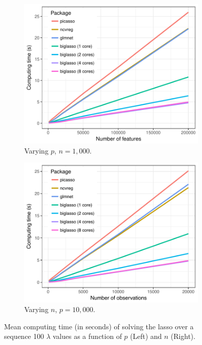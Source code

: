 \begin{figure}[ht]
\centering
\begin{subfigure}{.5\textwidth}
  \centering
  \includegraphics[width=\linewidth]{Figures/2018-02-27_vary_p_pkgs.pdf}
  \caption{Varying $p$, $n = 1,000$.}
\end{subfigure}%
\begin{subfigure}{.5\textwidth}
  \centering
  \includegraphics[width=\linewidth]{Figures/2018-02-27_vary_n_pkgs.pdf}
  \caption{Varying $n$, $p = 10,000$.}
\end{subfigure}
\caption{Mean computing time (in seconds) of solving the lasso over a sequence 100 $\lambda$ values as a function of $p$ (Left) and $n$ (Right).}
\label{fig:simu_res}
\end{figure}


